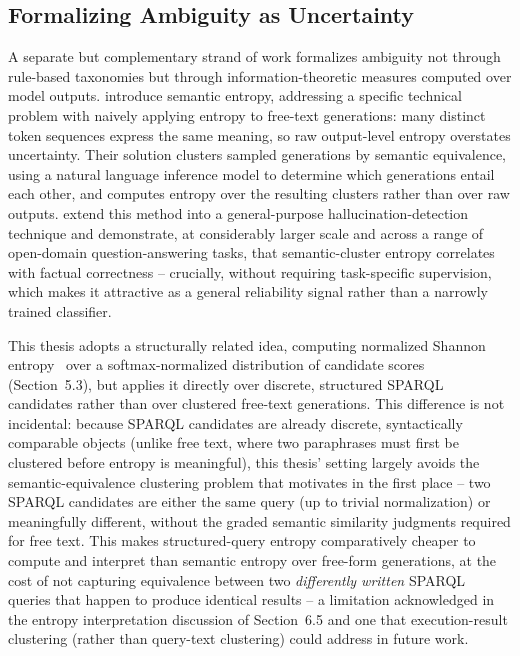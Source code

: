 \documentclass[
  12pt,
  english,
  oneside]{report}
\begin{document}
\subsection{Formalizing Ambiguity as Uncertainty}

A separate but complementary strand of work formalizes ambiguity not
through rule-based taxonomies but through information-theoretic measures
computed over model outputs. \citet{kuhn2023semantic} introduce semantic
entropy, addressing a specific technical problem with naively applying
entropy to free-text generations: many distinct token sequences express
the same meaning, so raw output-level entropy overstates uncertainty. Their
solution clusters sampled generations by semantic equivalence, using a
natural language inference model to determine which generations entail
each other, and computes entropy over the resulting clusters rather than
over raw outputs. \citet{farquhar2024detecting} extend this method into a
general-purpose hallucination-detection technique and demonstrate, at
considerably larger scale and across a range of open-domain
question-answering tasks, that semantic-cluster entropy correlates with
factual correctness -- crucially, without requiring task-specific
supervision, which makes it attractive as a general reliability signal
rather than a narrowly trained classifier.

This thesis adopts a structurally related idea, computing normalized
Shannon entropy~\cite{shannon1948mathematical} over a softmax-normalized
distribution of candidate scores (Section~5.3), but applies it directly
over discrete, structured SPARQL candidates rather than over clustered
free-text generations. This difference is not incidental: because SPARQL
candidates are already discrete, syntactically comparable objects (unlike
free text, where two paraphrases must first be clustered before entropy is
meaningful), this thesis' setting largely avoids the semantic-equivalence
clustering problem that motivates \citet{kuhn2023semantic} in the first
place -- two SPARQL candidates are either the same query (up to trivial
normalization) or meaningfully different, without the graded semantic
similarity judgments required for free text. This makes structured-query
entropy comparatively cheaper to compute and interpret than semantic
entropy over free-form generations, at the cost of not capturing
equivalence between two \emph{differently written} SPARQL queries that
happen to produce identical results -- a limitation acknowledged in the
entropy interpretation discussion of Section~6.5 and one that
execution-result clustering (rather than query-text clustering) could
address in future work.
\end{document}
